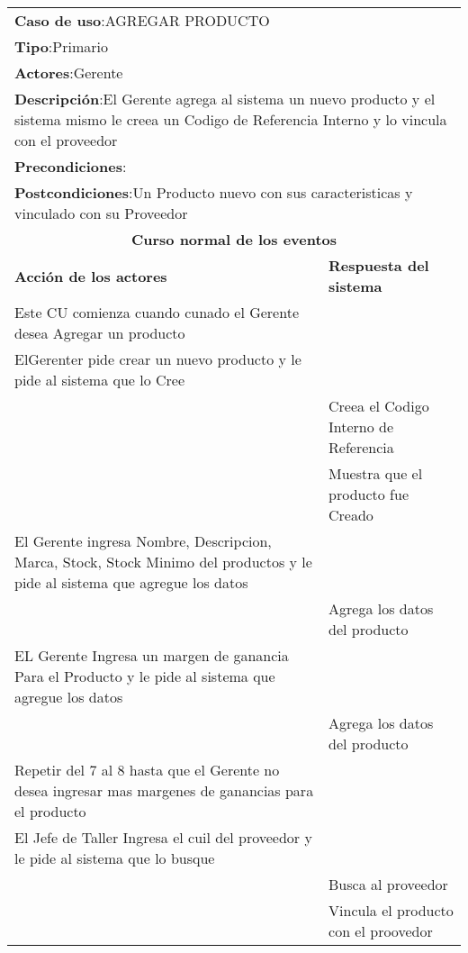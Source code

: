 \begin{longtable}{ |p{8cm}|p{8cm}| }
		\hline
		\multicolumn{2}{|p{16cm}|}{\textbf{Caso de uso}:AGREGAR PRODUCTO }\\
		\multicolumn{2}{|p{16cm}|}{\textbf{Tipo}:Primario }\\
		\multicolumn{2}{|p{16cm}|}{\textbf{Actores}:Gerente }\\
		\multicolumn{2}{|p{16cm}|}{\textbf{Descripción}:El Gerente agrega al sistema un nuevo producto y el sistema mismo le creea un Codigo de Referencia Interno y lo vincula con el proveedor }\\
		\multicolumn{2}{|p{16cm}|}{\textbf{Precondiciones}: }\\
		\multicolumn{2}{|p{16cm}|}{\textbf{Postcondiciones}:Un Producto nuevo con sus caracteristicas y vinculado con su Proveedor }\\
		\hline
		\multicolumn{2}{|c|}{\textbf{Curso normal de los eventos}}\\
		\hline
		\textbf{Acción de los actores} & \textbf{Respuesta del sistema}\\
		\hline
			\inc Este CU comienza cuando cunado el Gerente desea Agregar un producto & \\
			\hline
			\inc ElGerenter pide crear un nuevo producto y le pide al sistema que lo Cree &   \\
			\hline
			& \inc Creea el Codigo Interno de Referencia  \\
			\hline
			& \inc Muestra que el producto fue Creado  \\
			\hline
			\inc El Gerente ingresa Nombre, Descripcion,  Marca, Stock, Stock Minimo del productos y le pide al sistema que agregue los datos &   \\
			\hline
			& \inc Agrega los datos del producto \\
			\hline
			\inc EL Gerente Ingresa un margen de ganancia Para el Producto y le pide al sistema que agregue los datos &   \\
			\hline
			& \inc Agrega los datos del producto \\
			\hline
			\inc Repetir del 7 al 8 hasta que el Gerente no desea ingresar mas margenes de ganancias para el producto &  \\
			\hline
			\inc  El Jefe de Taller Ingresa el cuil del proveedor y le pide al sistema que lo busque  &    \\
			\hline
			& \inc Busca al proveedor  \\
			\hline
			& \inc  Vincula el producto con el proovedor  \\

\end{longtable}
